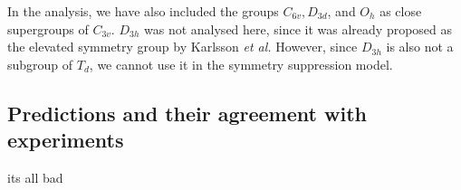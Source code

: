 In the analysis, we have also included the groups $C_{6v}, D_{3d}$, and $O_h$ as close supergroups of $C_{3v}$. $D_{3h}$ was not analysed here, since it was already proposed as the elevated symmetry group by Karlsson \textit{et al.} However, since $D_{3h}$ is also not a subgroup of $T_d$, we cannot use it in the symmetry suppression model.

\subsection{Predictions and their agreement with experiments}
its all bad


